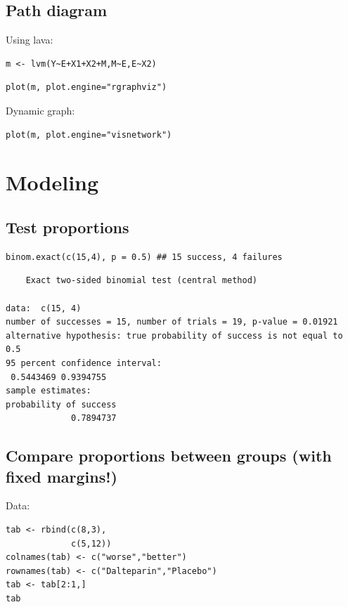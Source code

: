 \documentclass{article}
\begin{document}
\subsection{Path diagram}
\label{sec:org8d5e588}
Using lava:
\lstset{language=r,label= ,caption= ,captionpos=b,numbers=none}
\begin{lstlisting}
m <- lvm(Y~E+X1+X2+M,M~E,E~X2)
\end{lstlisting}

\lstset{language=r,label= ,caption= ,captionpos=b,numbers=none}
\begin{lstlisting}
plot(m, plot.engine="rgraphviz")
\end{lstlisting}

Dynamic graph:
\lstset{language=r,label= ,caption= ,captionpos=b,numbers=none}
\begin{lstlisting}
plot(m, plot.engine="visnetwork")
\end{lstlisting}

\section{Modeling}
\label{sec:orgd8e17ca}
\subsection{Test proportions}
\label{sec:org6767cdb}
\lstset{language=r,label= ,caption= ,captionpos=b,numbers=none}
\begin{lstlisting}
binom.exact(c(15,4), p = 0.5) ## 15 success, 4 failures
\end{lstlisting}

\begin{verbatim}
	Exact two-sided binomial test (central method)

data:  c(15, 4)
number of successes = 15, number of trials = 19, p-value = 0.01921
alternative hypothesis: true probability of success is not equal to 0.5
95 percent confidence interval:
 0.5443469 0.9394755
sample estimates:
probability of success 
             0.7894737
\end{verbatim}

\subsection{Compare proportions between groups (with fixed margins!)}
\label{sec:org9114f24}

Data:
\lstset{language=r,label= ,caption= ,captionpos=b,numbers=none}
\begin{lstlisting}
tab <- rbind(c(8,3),
			 c(5,12))
colnames(tab) <- c("worse","better")
rownames(tab) <- c("Dalteparin","Placebo")
tab <- tab[2:1,]
tab
\end{lstlisting}
\end{document}
